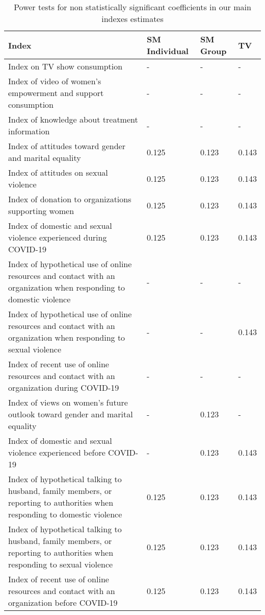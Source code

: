 \begin{table}[H]
\centering
\caption{Power tests for non statistically significant coefficients in our main indexes estimates} 
\label{tab:PowerTests}
\begingroup\scriptsize
\begin{tabular}{p{}p{}p{}p{}}
  \hline
Index & SM Individual & SM Group & TV \\ 
  \hline
Index on TV show consumption & - & - & - \\ 
  Index of video of women's empowerment and support consumption & - & - & - \\ 
  Index of knowledge about treatment information & - & - & - \\ 
  Index of attitudes toward gender and marital equality & 0.125 & 0.123 & 0.143 \\ 
  Index of attitudes on sexual violence & 0.125 & 0.123 & 0.143 \\ 
  Index of donation to organizations supporting women & 0.125 & 0.123 & 0.143 \\ 
  Index of domestic and sexual violence experienced during COVID-19 & 0.125 & 0.123 & 0.143 \\ 
  Index of hypothetical use of online resources and contact with an organization when responding to domestic violence & - & - & - \\ 
  Index of hypothetical use of online resources and contact with an organization when responding to sexual violence & - & - & 0.143 \\ 
  Index of recent use of online resources and contact with an organization during COVID-19 & - & - & - \\ 
  Index of views on women's future outlook toward gender and marital equality & - & 0.123 & - \\ 
  Index of domestic and sexual violence experienced before COVID-19 & - & 0.123 & 0.143 \\ 
  Index of hypothetical talking to husband, family members, or reporting to authorities when responding to domestic violence & 0.125 & 0.123 & 0.143 \\ 
  Index of hypothetical talking to husband, family members, or reporting to authorities when responding to sexual violence & 0.125 & 0.123 & 0.143 \\ 
  Index of recent use of online resources and contact with an organization before COVID-19 & 0.125 & 0.123 & 0.143 \\ 
   \hline
\end{tabular}
\endgroup
{} \end{table}
